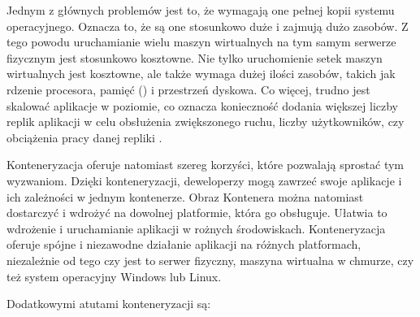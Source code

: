 Jednym z głównych problemów jest to, że wymagają one pełnej kopii systemu operacyjnego. Oznacza to, że są one stosunkowo duże i zajmują dużo zasobów. Z tego powodu uruchamianie wielu maszyn wirtualnych na tym samym serwerze fizycznym jest stosunkowo kosztowne. Nie tylko uruchomienie setek maszyn wirtualnych jest kosztowne, ale także wymaga dużej ilości zasobów, takich jak rdzenie procesora, pamięć  () i przestrzeń dyskowa. Co więcej, trudno jest skalować aplikacje w poziomie, co oznacza konieczność dodania większej liczby replik aplikacji w celu obsłużenia zwiększonego ruchu, liczby użytkowników, czy obciążenia pracy danej repliki \cite{dockerContenerizationKeyAndUseCases}.

Konteneryzacja oferuje natomiast szereg korzyści, które pozwalają sprostać tym wyzwaniom. Dzięki konteneryzacji, deweloperzy mogą zawrzeć swoje aplikacje i ich zależności w jednym kontenerze. Obraz Kontenera można natomiast dostarczyć i wdrożyć na dowolnej platformie, która go obsługuje. Ułatwia to wdrożenie i uruchamianie aplikacji w rożnych środowiskach. Konteneryzacja oferuje spójne i niezawodne działanie aplikacji na różnych platformach, niezależnie od tego czy jest to serwer fizyczny, maszyna wirtualna w chmurze, czy też system operacyjny Windows lub Linux\cite{dockerContenerizationKeyAndUseCases}\cite{dockerOverview}. 

Dodatkowymi atutami konteneryzacji są:

